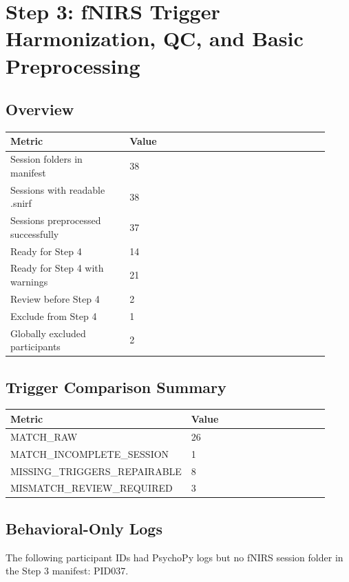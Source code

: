 \documentclass[11pt]{article}
\begin{document}
\section*{Step 3: fNIRS Trigger Harmonization, QC, and Basic Preprocessing}
\subsection*{Overview}
\begin{tabular}{p{0.34\linewidth}p{0.58\linewidth}}
\toprule
Metric & Value\\
\midrule
Session folders in manifest & 38\\
Sessions with readable .snirf & 38\\
Sessions preprocessed successfully & 37\\
Ready for Step 4 & 14\\
Ready for Step 4 with warnings & 21\\
Review before Step 4 & 2\\
Exclude from Step 4 & 1\\
Globally excluded participants & 2\\
\bottomrule
\end{tabular}
\subsection*{Trigger Comparison Summary}
\begin{tabular}{p{0.34\linewidth}p{0.58\linewidth}}
\toprule
Metric & Value\\
\midrule
MATCH\_RAW & 26\\
MATCH\_INCOMPLETE\_SESSION & 1\\
MISSING\_TRIGGERS\_REPAIRABLE & 8\\
MISMATCH\_REVIEW\_REQUIRED & 3\\
\bottomrule
\end{tabular}
\subsection*{Behavioral-Only Logs}
The following participant IDs had PsychoPy logs but no fNIRS session folder in the Step 3 manifest: PID037.
\end{document}
